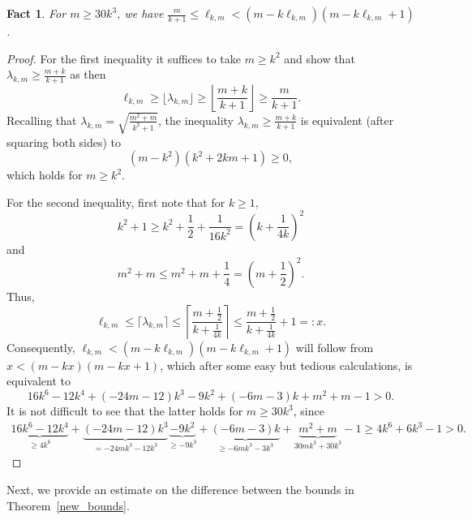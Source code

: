 \documentclass[reqno, 12pt]{amsart}
\numberwithin{equation}{section}
\numberwithin{figure}{section}
\theoremstyle{plain}
\newtheorem{fact}[thm]{Fact}
\theoremstyle{definition}
\begin{document}
\begin{fact}
\label{AD}
For $m\ge 30k^3$, we have $\frac m{k+1}\le\ell_{k,m}<(m-k\ell_{k,m})(m-k\ell_{k,m}+1)$.
\end{fact}


\begin{proof}
For the first inequality it suffices to take $m\ge k^2$ and show that $\lambda_{k,m}\ge \frac{m+k}{k+1}$ as then $$\ell_{k,m}\ge\lfloor\lambda_{k,m}\rfloor\ge \left\lfloor\frac{m+k}{k+1}\right\rfloor\ge\frac m{k+1}.$$
Recalling that $\lambda_{k,m}=\sqrt{\frac{m^2+m}{k^2+1}}$, the inequality $\lambda_{k,m}\ge \frac{m+k}{k+1} $ is equivalent (after squaring both sides) to
\[
(m-k^2)(k^2+2km+1) \ge 0,
\]
which holds for $m\ge k^2$.

For the second inequality, first note that for $k\ge 1$,
\[
k^2+1 \ge k^2 + \frac{1}{2} + \frac{1}{16k^2} = \left(k+\frac{1}{4k} \right)^2
\]
and
\[
m^2+m \le m^2+m+\frac{1}{4} = \left(m+\frac{1}{2} \right)^2.
\]
Thus,
\[
\ell_{k,m} \le \lceil \lambda_{k,m} \rceil
\le \left\lceil \frac{m+\frac{1}{2}}{k+\frac{1}{4k}} \right\rceil
\le \frac{m+\frac{1}{2}}{k+\frac{1}{4k}} + 1=:x.
\]
Consequently, $\ell_{k,m}<(m-k\ell_{k,m})(m-k\ell_{k,m}+1)$ will follow from $x<(m-kx)(m-kx+1)$, which after some easy but tedious calculations, is equivalent to
\[
16k^6 - 12k^4 + (-24m - 12)k^3 - 9k^2 + (-6m - 3)k + m^2 + m - 1 > 0.
\]
It is not difficult to see that the latter holds for $m\ge 30k^3$, since
\begin{align*}
\underbrace{16k^6 - 12k^4}_{\ge 4k^6} + \underbrace{(-24m - 12)k^3}_{=-24mk^3-12k^3} \underbrace{- 9k^2}_{\ge-9k^3} + \underbrace{(-6m - 3)k}_{\ge-6mk^3-3k^3} + \underbrace{m^2 + m}_{30mk^3 + 30k^3}-1
\ge 4k^6+6k^3-1>0.
\end{align*}
\end{proof}	
	
Next, we provide an estimate on the difference between the bounds in Theorem~\ref{new_bounds}.
\end{document}

